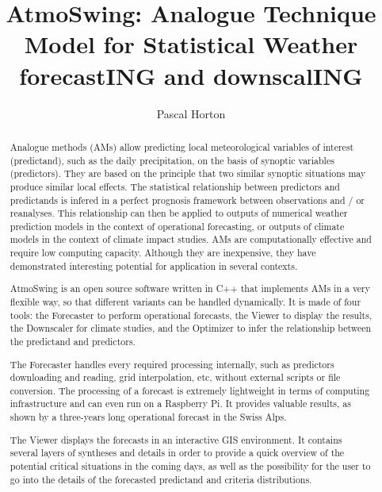 \documentclass[review]{elsarticle}
\begin{document}
\begin{frontmatter}

\title{AtmoSwing: Analogue Technique Model for Statistical Weather forecastING and downscalING}


\author[unibe,unil,terranum]{Pascal Horton}


\address[unibe]{University of Bern, Oeschger Centre for Climate Change Research, Institute of Geography, Bern, Switzerland}
\address[unil]{University of Lausanne, Institute of Earth Sciences, Lausanne, Switzerland}
\address[terranum]{Terranum SARL, Bussigny, Switzerland}



\begin{abstract}
Analogue methods (AMs) allow predicting local meteorological variables of interest (predictand), such as the daily precipitation, on the basis of synoptic variables (predictors). They are based on the principle that two similar synoptic situations may produce similar local effects. The statistical relationship between predictors and predictands is infered in a perfect prognosis framework between observations and / or reanalyses. This relationship can then be applied to outputs of numerical weather prediction models in the context of operational forecasting, or outputs of climate models in the context of climate impact studies. AMs are computationally effective and require low computing capacity. Although they are inexpensive, they have demonstrated interesting potential for application in several contexts.

AtmoSwing is an open source software written in C++ that implements AMs in a very flexible way, so that different variants can be handled dynamically. It is made of four tools: the Forecaster to perform operational forecasts, the Viewer to display the results, the Downscaler for climate studies, and the Optimizer to infer the relationship between the predictand and predictors. 

The Forecaster handles every required processing internally, such as predictors downloading and reading, grid interpolation, etc, without external scripts or file conversion. The processing of a forecast is extremely lightweight in terms of computing infrastructure and can even run on a Raspberry Pi. It provides valuable results, as shown by a three-years long operational forecast in the Swiss Alps.

The Viewer displays the forecasts in an interactive GIS environment. It contains several layers of syntheses and details in order to provide a quick overview of the potential critical situations in the coming days, as well as the possibility for the user to go into the details of the forecasted predictand and criteria distributions.


\end{abstract}
\end{frontmatter}
\end{document}

